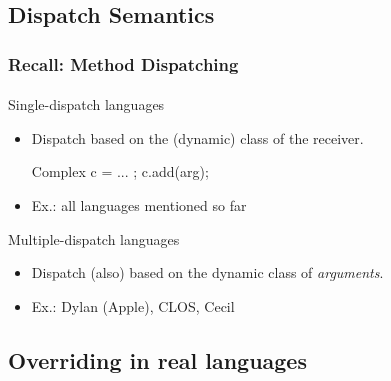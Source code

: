 \documentclass{beamer}
\begin{document}
\subsection{Dispatch Semantics}
\begin{frame}[fragile]
\frametitle{Recall: Method Dispatching}
\framesubtitle{}

Single-dispatch languages
\begin{itemize}
\item Dispatch based on the (dynamic) class of the receiver. 
\begin{cplus3}
     Complex c = ... ;   
     c.add(arg);
\end{cplus3}
\item Ex.: all languages mentioned so far

\end{itemize}

Multiple-dispatch languages
\begin{itemize}
\item Dispatch (also) based on the dynamic class of \textit{arguments}.
\item Ex.: Dylan (Apple), CLOS, Cecil
\end{itemize} 
\end{frame}


\subsection{Overriding in real languages}
\end{document}
